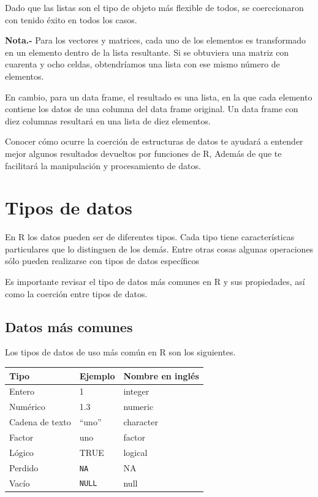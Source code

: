 \documentclass[
]{book}
\begin{document}
Dado que las listas son el tipo de objeto más flexible de todos, se coerccionaron con tenido éxito en todos los casos.

\textbf{Nota.-} Para los vectores y matrices, cada uno de los elementos es transformado en un elemento dentro de la lista resultante. Si se obtuviera una matriz con cuarenta y ocho celdas, obtendríamos una lista con ese mismo número de elementos.

En cambio, para un data frame, el resultado es una lista, en la que cada elemento contiene los datos de una columna del data frame original. Un data frame con diez columnas resultará en una lista de diez elementos.

Conocer cómo ocurre la coerción de estructuras de datos te ayudará a entender mejor algunos resultados devueltos por funciones de R, Además de que te facilitará la manipulación y procesamiento de datos.

\hypertarget{tipos-de-datos}{%
\chapter{Tipos de datos}\label{tipos-de-datos}}

En R los datos pueden ser de diferentes tipos. Cada tipo tiene características particulares que lo distinguen de los demás. Entre otras cosas algunas operaciones sólo pueden realizarse con tipos de datos específicos

Es importante revisar el tipo de datos más comunes en R y sus propiedades, así como la coerción entre tipos de datos.

\hypertarget{datos-muxe1s-comunes}{%
\section{Datos más comunes}\label{datos-muxe1s-comunes}}

Los tipos de datos de uso más común en R son los siguientes.

\begin{longtable}[]{@{}lll@{}}
\toprule()
Tipo & Ejemplo & Nombre en inglés \\
\midrule()
\endhead
Entero & 1 & integer \\
Numérico & 1.3 & numeric \\
Cadena de texto & ``uno'' & character \\
Factor & uno & factor \\
Lógico & TRUE & logical \\
Perdido & \texttt{NA} & NA \\
Vacío & \texttt{NULL} & null \\
\bottomrule()
\end{longtable}
\end{document}
